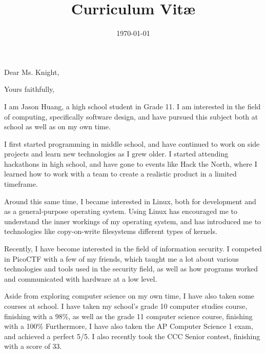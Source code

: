 \documentclass[11pt,a4paper,sans]{moderncv}        %
\title{Curriculum Vit\ae}                               %
\begin{document}
\date{\today}
\opening{Dear Ms. Knight,}
\closing{Yours faithfully,}
\makelettertitle


I am Jason Huang, a high school student in Grade 11.
I am interested in the field of computing, specifically software design,
and have pursued this subject both at school as well as on my own time.

I first started programming in middle school, and have continued to work on side projects and learn new technologies as I grew older. 
I started attending hackathons in high school, and have gone to events like Hack the North, where I learned how to work with a team to create a realistic product in a limited timeframe.

Around this same time, I became interested in Linux, both for development and as a general-purpose operating system.
Using Linux has encouraged me to understand the inner workings of my operating system, and has introduced me to technologies like copy-on-write filesystems different types of kernels.

Recently, I have become interested in the field of information security.
I competed in PicoCTF with a few of my friends, which taught me a lot about various technologies and tools used in the security field, as well as how programs worked and communicated with hardware at a low level.

Aside from exploring computer science on my own time, I have also taken some courses at school.
I have taken my school's grade 10 computer studies course, finishing with a 98\%, as well as the grade 11 computer science course, finishing with a 100\%
Furthermore, I have also taken the AP Computer Science 1 exam, and achieved a perfect 5/5.
I also recently took the CCC Senior contest, finishing with a score of 33.
\end{document}
